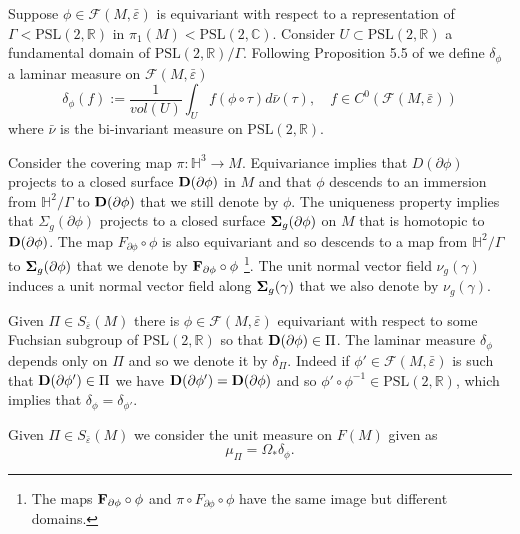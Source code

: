 \documentclass[11pt]{amsart}
\def\R{\mathbb R}
\def\H{\mathbb H}
\def\C{\mathbb C}
\theoremstyle{remark}
\theoremstyle{definition}
\begin{document}
{{	Suppose $\phi \in\mathcal F(M,\bar\varepsilon)$ is equivariant with respect to a representation of $\Gamma< \text{PSL}(2,\R)$ in $\pi_1(M)<\text{PSL}(2,\C)$. Consider $U\subset \text{PSL}(2,\R)$ a fundamental domain of $\text{PSL}(2,\R)/ \Gamma$. Following Proposition 5.5 of \cite{Labourie} we define $\delta_{\phi}$ a laminar measure on $\mathcal F(M,\bar\varepsilon)$
	$$\delta_\phi(f):=\frac{1}{vol(U)}\int_U f(\phi\circ \tau)d\bar\nu(\tau),\quad f\in C^0(\mathcal F(M,\bar\varepsilon))$$
	where $\bar\nu$ is the bi-invariant measure on $\text{PSL}(2,\R)$.
	
	Consider the covering map $\pi:\H^3\rightarrow M$. Equivariance implies that $D(\partial \phi)$ projects to a closed surface  ${\bf D(\partial \phi)}$ in $M$ and that $\phi$ descends to an immersion from $\H^2/ \Gamma$ to ${\bf D(\partial \phi)}$ that we still denote by ${\phi}$. The uniqueness property implies that $\Sigma_{g}(\partial \phi)$ projects to a closed surface ${\bf \Sigma}_{g}(\partial \phi)$ on $M$ that is homotopic to ${\bf D(\partial \phi)}$. The map  $F_{\partial \phi}\circ \phi $ is also equivariant and so descends to a map from 
	$\H^2/ \Gamma$ to ${\bf \Sigma}_{{g}}(\partial \phi)$ that we denote by $\bf{F_{\partial \phi}}\circ {\phi}$ \footnote{The maps $\bf{F_{\partial \phi}}\circ {\phi}$ and ${\pi\circ F_{\partial \phi}}\circ\phi$ have the same image but different domains.}.
	The unit normal vector field $\nu_g(\gamma)$ induces a unit normal vector field along  ${\bf \Sigma}_g(\gamma)$ that we also denote by $\nu_g(\gamma)$.
	
	{Given $\Pi\in S_{\bar \varepsilon}(M)$ there is $\phi\in \mathcal F(M,\bar\varepsilon)$ equivariant with respect to some Fuchsian subgroup of $\text{PSL}(2,\R)$ so that ${\bf D(\partial \phi)}\in \Pi$. The laminar measure $\delta_\phi$ depends only on $\Pi$ and so we denote it by $\delta_\Pi$. Indeed if $\phi'\in \mathcal F(M,\bar\varepsilon)$ is such that ${\bf D(\partial \phi')}\in \Pi$ we have ${\bf D(\partial \phi')}={\bf D(\partial \phi)}$ and so $\phi'\circ \phi^{-1}\in\text{PSL}(2,\R)$, which implies that $\delta_\phi=\delta_{\phi'}$. 
	
	Given $\Pi\in S_{\bar \varepsilon}(M)$ we consider the  unit measure on $F(M)$ given as 
	\begin{equation}\label{pi.measure}
	\mu_{\Pi}=\Omega_*\delta_\phi.
	\end{equation}
	}
	
}}
\end{document}
